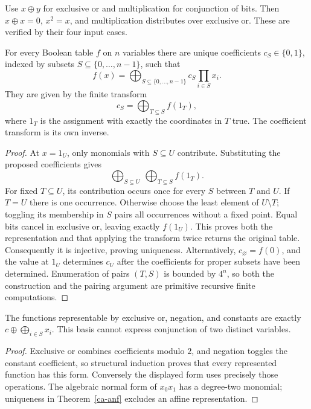 Use $x\oplus y$ for exclusive or and multiplication for conjunction of bits.
Then $x\oplus x=0$, $x^2=x$, and multiplication distributes over exclusive
or.  These are verified by their four input cases.

\begin{theorem}\label{ca-anf}
For every Boolean table $f$ on $n$ variables there are unique coefficients
$c_S\in\{0,1\}$, indexed by subsets $S\subseteq\{0,\ldots,n-1\}$, such that
\[
 f(x)=\bigoplus_{S\subseteq\{0,\ldots,n-1\}}
                  c_S\prod_{i\in S}x_i.
\]
They are given by the finite transform
\[
 c_S=\bigoplus_{T\subseteq S}f(1_T),
\]
where $1_T$ is the assignment with exactly the coordinates in $T$ true.
The coefficient transform is its own inverse.
\end{theorem}
\begin{proof}
At $x=1_U$, only monomials with $S\subseteq U$ contribute.  Substituting
the proposed coefficients gives
\[
 \bigoplus_{S\subseteq U}\ \bigoplus_{T\subseteq S}f(1_T).
\]
For fixed $T\subseteq U$, its contribution occurs once for every $S$
between $T$ and $U$.  If $T=U$ there is one occurrence.  Otherwise choose
the least element of $U\setminus T$; toggling its membership in $S$ pairs
all occurrences without a fixed point.  Equal bits cancel in exclusive or,
leaving exactly $f(1_U)$.  This proves both the representation and that
applying the transform twice returns the original table.  Consequently it
is injective, proving uniqueness.  Alternatively, $c_\varnothing=f(0)$,
and the value at $1_U$ determines $c_U$ after the coefficients for proper
subsets have been determined.  Enumeration of pairs $(T,S)$ is bounded by
$4^n$, so both the construction and the pairing argument are primitive
recursive finite computations.
\end{proof}

\begin{corollary}\label{ca-affine}
The functions representable by exclusive or, negation, and constants are
exactly $c\oplus\bigoplus_{i\in S}x_i$.  This basis cannot express
conjunction of two distinct variables.
\end{corollary}
\begin{proof}
Exclusive or combines coefficients modulo $2$, and negation toggles the
constant coefficient, so structural induction proves that every represented
function has this form.  Conversely the displayed form uses precisely those
operations.  The algebraic normal form of $x_0x_1$ has a degree-two monomial;
uniqueness in Theorem~\ref{ca-anf} excludes an affine representation.
\end{proof}

